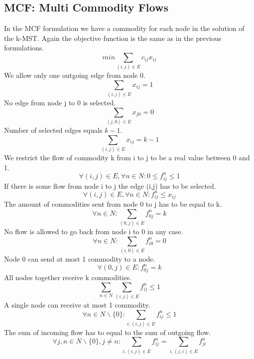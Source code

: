 \documentclass{article}
\begin{document}
\subsection{MCF: Multi Commodity Flows \label{mcf}}
In the MCF formulation we have a commodity for each node in the solution of the k-MST. Again the objective function is the same as in the previous formulations.
\setcounter{equation}{0}
\begin{equation}
min \sum_{(i,j) \in E} c_{ij} x_{ij}
\end{equation}
We allow only one outgoing edge from node 0.
\begin{equation}
\sum_{(i,j) \in E} x_{ij} = 1
\end{equation}
No edge from node j to 0 is selected.
\begin{equation}
\sum_{(j,0) \in E} x_{j0} = 0
\end{equation}
Number of selected edges equals $k-1$.
\begin{equation}
\sum_{(i,j) \in E} x_{ij} = k - 1
\end{equation}
We restrict the flow of commodity k from i to j to be a real value between 0 and 1.
\begin{equation}
\forall (i,j) \in E, \forall n \in N : 0 \le f_{ij}^{n} \le 1
\end{equation}
If there is some flow from node i to j the edge (i,j) has to be selected.
\begin{equation}
\forall (i,j) \in E, \forall n \in N : f_{ij}^{n} \le x_{ij} 
\end{equation}
The amount of commodities sent from node 0 to j has to be equal to k.
\begin{equation}
\forall n \in N: \sum_{(0,j) \in E} f_{0j}^{n} = k
\end{equation}
No flow is allowed to go back from node i to 0 in any case.
\begin{equation}
\forall n \in N: \sum_{(i,0) \in E} f_{i0}^{n} = 0
\end{equation}
Node 0 can send at most 1 commodity to a node.
\begin{equation}
\forall (0,j) \in E : f_{0j}^{n} = k
\end{equation}
All nodes together receive k commodities.
\begin{equation}
\sum_{n \in N} \sum_{(i,j) \in E} f_{ij}^{n} \le 1
\end{equation}
A single node can receive at most 1 commodity.
\begin{equation}
\forall n \in N \backslash \{0\} : \sum_{i,(i,j) \in E} f_{ij}^{n} \le 1
\end{equation}
The sum of incoming flow has to equal to the sum of outgoing flow.
\begin{equation}
\forall j,n \in N \backslash \{0\}, j \not= n : \sum_{i,(i,j) \in E} f_{ij}^{n} = \sum_{i,(j,i) \in E} f_{ji}^{n}
\end{equation}


\end{document}
